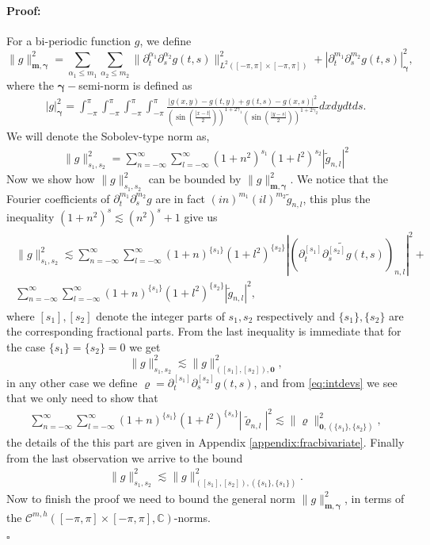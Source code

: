 \documentclass{article}
\newenvironment{proof}{\paragraph{Proof:}}{\hfill$\square$}
\newcommand{\IC}{{\mathbb C}}
\newcommand{\cmspaceh}[4]{\mathcal{C}^{#1,#2} \left( #3, #4 \right)}
\begin{document}
\begin{proof}
For a bi-periodic function $g$, we define 
$$\|g\|_{\mathbf{m},\mathbf{\gamma}}^2 = \sum_{\alpha_1 \leq m_1} \sum_{\alpha_2 \leq m_2} \| \partial_t^{\alpha_1} \partial_s^{\alpha_2} g(t,s) \|^2_{L^2([-\pi,\pi]\times [-\pi,\pi])}+  |\partial_t^{m_1} \partial_{s}^{m_2} g(t,s)|_{\mathbf{\gamma}}^2  ,$$
where the $\mathbf{\gamma}-$semi-norm is defined as 
\begin{align*}
|g|_{\mathbf{\gamma}}^2 = \int_{-\pi}^{\pi}  \int_{-\pi}^{\pi} \int_{-\pi}^{\pi}\int_{-\pi}^{\pi} \frac{| g(x,y)-g(t,y)+g(t,s)-g(x,s)|^2}
{\left(\sin\left(\frac{|x-t|}{2}\right)\right)^{1+2\gamma_1}\left(\sin\left(\frac{|y-s|}{2}\right)\right)^{1+2\gamma_2}}dx dy dt ds.
\end{align*}
We will denote the Sobolev-type norm as,
\begin{align}
\label{eq:sobnormtype}
\|g\|_{s_1,s_2}^2 = \sum_{n=-\infty}^\infty \sum_{l=-\infty}^\infty (1+n^2)^{s_1}(1+l^2)^{s_2}| \widetilde{g}_{n,l}|^2
\end{align}
Now we show how $\|g\|_{s_1,s_2}^2$ can be bounded by $ \|g\|_{\mathbf{m},\mathbf{\gamma}}^2$. We notice that the Fourier coefficients of $\partial_t^{m_1} \partial_s^{m_2} g$ are in fact $(i n)^{m_1} (i l)^{m_2} \widetilde{g}_{n,l}$, this plus the inequality $(1+n^2)^s \lesssim (n^2)^s+1$ give us 
\begin{align}
\label{eq:intdevs}
\begin{split}
\|g\|_{s_1,s_2}^2 \lesssim \sum_{n = -\infty}^\infty \sum_{l = -\infty}^\infty (1+n)^{\{s_1\}} (1+l^2)^{\{s_2\}} \left\vert\left(\widetilde{\partial_t^{[s_1]} \partial_s^{[s_2]}g(t,s)}\right)_{n,l}\right\vert^2+ \\
 \sum_{n = -\infty}^\infty \sum_{l = -\infty}^\infty (1+n)^{\{s_1\}} (1+l^2)^{\{s_2\}} \left\vert\widetilde{g}_{n,l}\right\vert^2
,
\end{split}
\end{align}
where $[s_1], [s_2]$ denote the integer parts of $s_1, s_2$ respectively and $\{s_1\}, \{s_2\}$ are the corresponding fractional parts. From the last inequality is immediate that for the case $\{s_1\}= \{s_2\} =0$ we get 
$$
\|g\|_{s_1,s_2}^2 \lesssim \|g\|^2_{([s_1],[s_2]),\mathbf{0}},
$$
in any other case we define $\varrho = \partial_t^{[s_1]} \partial_s^{[s_2]}g(t,s)$, and from \eqref{eq:intdevs} we see that we only need to show that 
\begin{align*}
 \sum_{n = -\infty}^\infty \sum_{l = -\infty}^\infty (1+n)^{\{s_1\}} (1+l^2)^{\{s_s\}} \left\vert\widetilde{\varrho}_{n,l}\right\vert^2 \lesssim \| \varrho \|^2_{\mathbf{0},(\{s_1\},\{s_2\})},
\end{align*}
the details of the this part are given in Appendix \ref{appendix:fracbivariate}. Finally  from the last observation we arrive to the bound
\begin{align}
\label{eq:gbound1}
\|g\|^2_{s_1,s_2} \lesssim \|g\|^2_{([s_1],[s_2]),(\{s_1\},\{s_1\})}. 
\end{align}
Now to finish the proof we need to bound the general norm $\|g\|_{\mathbf{m},\mathbf{\gamma}}^2$, in terms of the $\cmspaceh{m}{h}{[-\pi,\pi]\times[-\pi,\pi]}{\IC}$-norms.


\end{proof}
\end{document}
